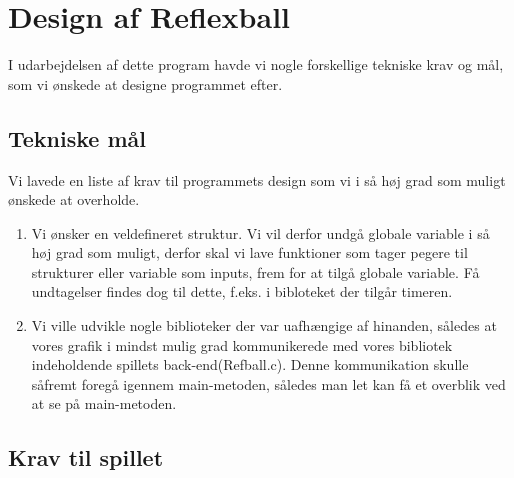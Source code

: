 \section{Design af Reflexball}
I udarbejdelsen af dette program havde vi nogle forskellige tekniske krav og mål, som vi ønskede at designe programmet efter.
\subsection{Tekniske mål}
Vi lavede en liste af krav til programmets design som vi i så høj grad som muligt ønskede at overholde. 
\begin{enumerate}
\item Vi ønsker en veldefineret struktur. Vi vil derfor undgå globale variable i så høj grad som muligt, derfor skal vi lave funktioner som tager pegere til strukturer eller variable som inputs, frem for at tilgå globale variable. Få undtagelser findes dog til dette, f.eks. i bibloteket der tilgår timeren.
\item Vi ville udvikle nogle biblioteker  der var uafhængige af hinanden, således at vores grafik i mindst mulig grad kommunikerede med vores bibliotek indeholdende spillets back-end(Refball.c). Denne kommunikation skulle såfremt foregå igennem main-metoden, således man let kan få et overblik ved at se på main-metoden.
	
\end{enumerate}


\subsection{Krav til spillet}
